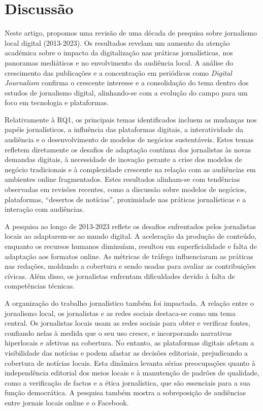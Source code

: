 \documentclass[portuguese]{textolivre}
\begin{document}
\section{Discussão}
Neste artigo, propomos uma revisão de uma década de pesquisa sobre jornalismo local digital (2013-2023). Os resultados revelam um aumento da atenção académica sobre o impacto da digitalização nas práticas jornalísticas, nos panoramas mediáticos e no envolvimento da audiência local. A análise do crescimento das publicações e a concentração em periódicos como \textit{Digital Journalism} confirma o crescente interesse e a consolidação do tema dentro dos estudos de jornalismo digital, alinhando-se com a evolução do campo para um foco em tecnologia e plataformas.

Relativamente à RQ1, os principais temas identificados incluem as mudanças nos papéis jornalísticos, a influência das plataformas digitais, a interatividade da audiência e o desenvolvimento de modelos de negócios sustentáveis. Estes temas refletem diretamente os desafios de adaptação contínua dos jornalistas às novas demandas digitais, à necessidade de inovação perante a crise dos modelos de negócio tradicionais e à complexidade crescente na relação com as audiências em ambientes online fragmentados. Estes resultados alinham-se com tendências observadas em revisões recentes, como a discussão sobre modelos de negócios, plataformas, “desertos de notícias”, proximidade nas práticas jornalísticas e a interação com audiências.

A pesquisa ao longo de 2013-2023 reflete os desafios enfrentados pelos jornalistas locais ao adaptarem-se ao mundo digital. A aceleração da produção de conteúdo, enquanto os recursos humanos diminuíam, resultou em superficialidade e falta de adaptação aos formatos online. As métricas de tráfego influenciaram as práticas nas redações, moldando a cobertura e sendo usadas para avaliar as contribuições cívicas. Além disso, os jornalistas enfrentam dificuldades devido à falta de competências técnicas.

A organização do trabalho jornalístico também foi impactada. A relação entre o jornalismo local, os jornalistas e as redes sociais destaca-se como um tema central. Os jornalistas locais usam as redes sociais para obter e verificar fontes, confiando nelas à medida que o seu uso cresce, e incorporando narrativas hiperlocais e afetivas na cobertura. No entanto, as plataformas digitais afetam a visibilidade das notícias e podem afastar as decisões editoriais, prejudicando a cobertura de notícias locais. Esta dinâmica levanta sérias preocupações quanto à independência editorial dos meios locais e à manutenção de padrões de qualidade, como a verificação de factos e a ética jornalística, que são essenciais para a sua função democrática. A pesquisa também mostra a sobreposição de audiências entre jornais locais online e o Facebook.
\end{document}
